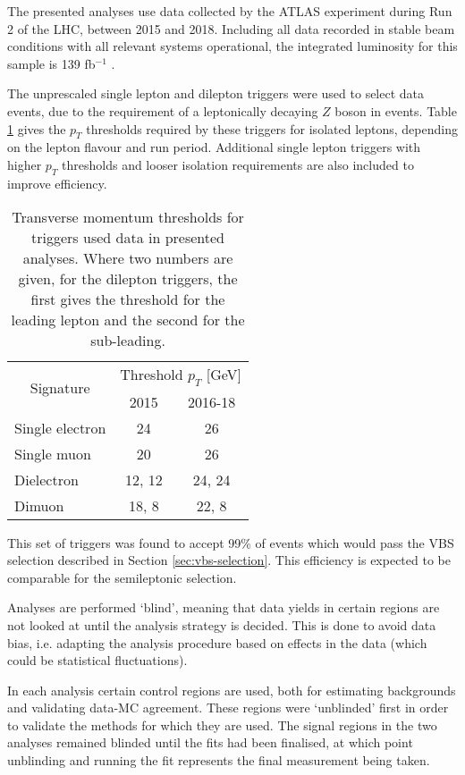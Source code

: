 
The presented analyses use data collected by the \ac{ATLAS} experiment during
Run 2 of the \ac{LHC}, between 2015 and 2018. Including all data recorded in
stable beam conditions with all relevant systems operational, the integrated
luminosity for this sample is 139 fb$^{-1}$ \cite{ATLASdq2020}.

The unprescaled single lepton and dilepton triggers
\cite{ATLAStrigegam2020,ATLAStrigmuon2020}
were used to select data events, due to the requirement of a leptonically
decaying $Z$ boson in events. Table \ref{tab:methods-data-triggers} gives the
$p_T$ thresholds required by these triggers for isolated leptons, depending on
the lepton flavour and run period. Additional single lepton triggers with higher
$p_T$ thresholds and looser isolation requirements are also included to improve
efficiency.

\begin{table}[tbh]
  \centering
  \renewcommand\arraystretch{1.2}
  \caption{
    Transverse momentum thresholds for triggers used data in presented analyses.
    Where two numbers are given, for the dilepton triggers, the first gives the
    threshold for the leading lepton and the second for the sub-leading.
  }
  \begin{tabular}{|l|c|c|}
    \hline
    \multicolumn{1}{|c|}{\multirow{2}{*}{Signature}} & \multicolumn{2}{|c|}{Threshold $p_T$ [GeV]} \\
    \cline{2-3}
              & 2015    &   2016-18 \\
    \hline
    Single electron  &  24     &  26     \\   
    Single muon      &  20     &  26     \\   
    Dielectron       &  12, 12  &  24, 24  \\
    Dimuon           &  18, 8   &  22, 8   \\
    \hline
  \end{tabular}
  \label{tab:methods-data-triggers}
\end{table}

This set of triggers was found to accept 99\% of events which would pass the
\acs{VBS} \Zy selection described in Section \ref{sec:vbs-selection}. This
efficiency is expected to be comparable for the semileptonic \VZy selection.

Analyses are performed `blind', meaning that data yields in certain regions are
not looked at until the analysis strategy is decided. This is done to avoid data
bias, i.e. adapting the analysis procedure based on effects in the data (which
could be statistical fluctuations).

In each analysis certain control regions are used, both for estimating
backgrounds and validating data-\ac{MC} agreement. These regions were `unblinded'
first in order to validate the methods for which they are used. The signal
regions in the two analyses remained blinded until the fits had been finalised,
at which point unblinding and running the fit represents the final measurement
being taken.
